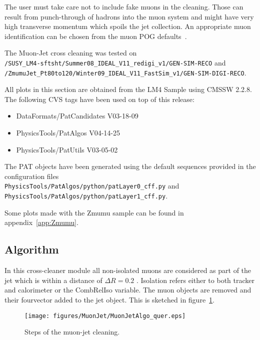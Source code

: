 \documentclass{cmspaper}
\begin{document}
The user must take care not to include fake muons in the cleaning. Those can
result from punch-through of hadrons into the muon system and might have very
high transverse momentum which spoils the jet collection. An appropriate muon
identification can be chosen from the muon POG defaults~\cite{muonID}.

The Muon-Jet cross cleaning was tested on \\
\texttt{/SUSY\_LM4-sftsht/Summer08\_IDEAL\_V11\_redigi\_v1/GEN-SIM-RECO} and\\
\texttt{/ZmumuJet\_Pt80to120/Winter09\_IDEAL\_V11\_FastSim\_v1/GEN-SIM-DIGI-RECO}.

All plots in this section are obtained from the LM4 Sample using CMSSW 2.2.8.
The following CVS tags have been used on top of this release:
\begin{itemize}
    \item DataFormats/PatCandidates V03-18-09      
    \item PhysicsTools/PatAlgos     V04-14-25      
    \item PhysicsTools/PatUtils     V03-05-02      
\end{itemize}
The PAT objects
have been generated using the default sequences provided in the configuration
files\\
\texttt{PhysicsTools/PatAlgos/python/patLayer0\_cff.py} and\\
\texttt{PhysicsTools/PatAlgos/python/patLayer1\_cff.py}.

Some plots made with the Zmumu sample can be found in appendix~\ref{app:Zmumu}.


\subsection{Algorithm}
In this cross-cleaner module all non-isolated muons are considered as part of
the jet which is within a distance of $\Delta R=0.2$ . Isolation refers either
to both tracker and calorimeter or the CombRelIso variable. The muon objects
are removed and their fourvector added to the jet object. 
This is sketched in figure~\ref{fig:MJCleaning}.

\begin{figure}[hbt]
\begin{center}
\texttt{[image: figures/MuonJet/MuonJetAlgo\_quer.eps]}
\caption{Steps of the muon-jet cleaning.}
\label{fig:MJCleaning}
\end{center}
\end{figure}
\end{document}
